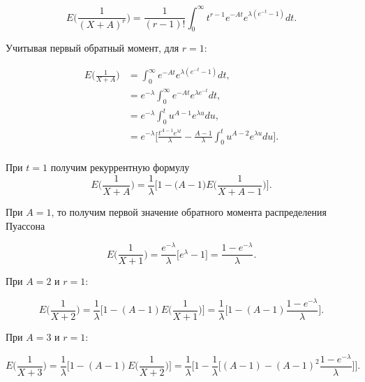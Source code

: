 \documentclass[13pt]{article}
\begin{document}
\begin{equation*}
    E\Big(\frac{1}{(X+A)^{r}}\Big) = \frac{1}{(r -1)!}\int_{0}^{\infty} t^{r-1}e^{-At}e^{\lambda (e^{-t}-1)}dt.
\end{equation*}

Учитывая первый обратный момент, для $r=1$:

\begin{align*}
   E\Big(\frac{1}{X+A}\Big) &= \int_{0}^{\infty} e^{-At}e^{\lambda (e^{-t}-1)}dt ,\\
   &=  e^{-\lambda}\int_{0}^{\infty}e^{-At}e^{\lambda e^{-t}}dt ,\\
   &= e^{-\lambda}\int_{0}^{t} u^{A-1}e^{\lambda u}du,\\
   &= e^{-\lambda}\bigg[\frac{t^{A-1}e^{\lambda t}}{\lambda} - \frac{A-1}{\lambda}\int_{0}^{t}u^{A-2}e^{\lambda u}du \bigg] .\\
\end{align*}

При $t=1$ получим рекуррентную формулу
\[
E\Big(\frac{1}{X+A}\Big)= \frac{1}{\lambda}\bigg[1- \big(A-1\big) E\Big(\frac{1}{X+A-1}\Big) \bigg].
\]

При $A=1$, то получим первой значение обратного момента распределения Пуассона

\begin{equation}\label{eq::24}
E\Big(\frac{1}{X+1}\Big)= \frac{e^{-\lambda}}{\lambda}\Big[e^{\lambda}-1\Big]=\frac{1-e^{-\lambda}}{\lambda}.
\end{equation}

При $A=2$ и $r=1$:

\begin{equation}\label{eq::25}
      E\Big(\frac{1}{X+2}\Big) = \frac{1}{\lambda}\Bigg[1-(A-1)E\Big(\frac{1}{X+1}\Big)\Bigg] =  \frac{1}{\lambda}\Bigg[1 - (A-1)\frac{1-e^{-\lambda}}{\lambda} \Bigg].
\end{equation}

При $A=3$ и $r=1$:

\begin{equation}\label{eq::26}
      E\Big(\frac{1}{X+3}\Big) = \frac{1}{\lambda}\Bigg[1-(A-1)E\Big(\frac{1}{X+2}\Big)\Bigg] =  \frac{1}{\lambda}\Bigg[1 - \frac{1}{\lambda}\Big[(A-1) - (A-1)^{2}\frac{1-e^{-\lambda}}{\lambda} \Big] \Bigg] .
\end{equation}
\end{document}
